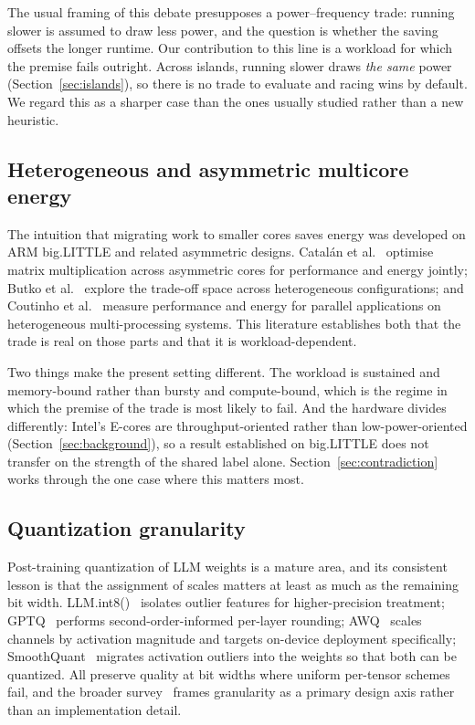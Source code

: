 \documentclass[journal]{IEEEtran}
\begin{document}
The usual framing of this debate presupposes a power--frequency trade: running
slower is assumed to draw less power, and the question is whether the saving
offsets the longer runtime. Our contribution to this line is a workload for
which the premise fails outright. Across islands, running slower draws
\emph{the same} power (Section~\ref{sec:islands}), so there is no trade to
evaluate and racing wins by default. We regard this as a sharper case than the
ones usually studied rather than a new heuristic.

\subsection{Heterogeneous and asymmetric multicore energy}
The intuition that migrating work to smaller cores saves energy was developed
on ARM big.LITTLE and related asymmetric designs. Catal\'{a}n et
al.~\cite{catalan2015bigLITTLE} optimise matrix multiplication across
asymmetric cores for performance and energy jointly; Butko et
al.~\cite{butko2019exploration} explore the trade-off space across
heterogeneous configurations; and Coutinho et al.~\cite{coutinho2020tradeoffs}
measure performance and energy for parallel applications on heterogeneous
multi-processing systems. This literature establishes both that the trade is
real on those parts and that it is workload-dependent.

Two things make the present setting different. The workload is sustained and
memory-bound rather than bursty and compute-bound, which is the regime in which
the premise of the trade is most likely to fail. And the hardware divides
differently: Intel's E-cores are throughput-oriented rather than
low-power-oriented (Section~\ref{sec:background}), so a result established on
big.LITTLE does not transfer on the strength of the shared label alone.
Section~\ref{sec:contradiction} works through the one case where this matters
most.

\subsection{Quantization granularity}
Post-training quantization of LLM weights is a mature area, and its consistent
lesson is that the assignment of scales matters at least as much as the
remaining bit width. LLM.int8()~\cite{dettmers2022llmint8} isolates outlier
features for higher-precision treatment; GPTQ~\cite{frantar2023gptq} performs
second-order-informed per-layer rounding; AWQ~\cite{lin2024awq} scales channels
by activation magnitude and targets on-device deployment specifically;
SmoothQuant~\cite{xiao2023smoothquant} migrates activation outliers into the
weights so that both can be quantized. All preserve quality at bit widths where
uniform per-tensor schemes fail, and the broader
survey~\cite{gholami2022quantsurvey} frames granularity as a primary design
axis rather than an implementation detail.
\end{document}
